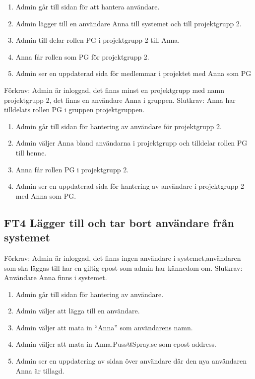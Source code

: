 \documentclass[paper=a4, fontsize=11pt,twoside]{article}
\begin{document}
	\begin{enumerate}
		\item Admin går till sidan för att hantera användare.
		\item Admin lägger till en användare Anna till systemet och till projektgrupp
		2.
		\item Admin till delar rollen PG i projektgrupp 2 till Anna.
		\item Anna får rollen som PG för projektgrupp 2.
		\item Admin ser en uppdaterad sida för medlemmar i projektet med Anna som PG
	\end{enumerate}
	
	Förkrav: Admin är inloggad, det finns minst en projektgrupp med namn
	projektgrupp 2, det finns en användare Anna i gruppen.
	\newline
	Slutkrav: Anna har tilldelats rollen PG i gruppen projektgruppen.
 	
 	\begin{enumerate}
	\item Admin går till sidan för hantering av användare för projektgrupp 2.
	\item Admin väljer Anna bland användarna i projektgrupp  och tilldelar rollen
	PG till henne.
	\item Anna får rollen PG i projektgrupp 2.
	\item Admin ser en uppdaterad sida för hantering av användare i projektgrupp 2
	med Anna som PG.
		
	\end{enumerate}
	
	\subsection*{FT4 Lägger till och tar bort användare från systemet}
	
	Förkrav: Admin är inloggad, det finns ingen användare i systemet,användaren som
	ska läggas till har en giltig epost som admin har kännedom om.
	\newline
	Slutkrav: Användare Anna finns i systemet.
	
	\begin{enumerate}
	  \item Admin går till sidan för hantering av användare.
	  \item Admin väljer att lägga till en användare.
	  \item Admin väljer att mata in “Anna” som användarens namn.
	  \item Admin väljer att mata in  Anna.Puss@Spray.se som epost address.
		\item Admin ser en uppdatering av sidan över användare där den nya användaren
		Anna är tillagd.
	\end{enumerate}
	
\end{document}

